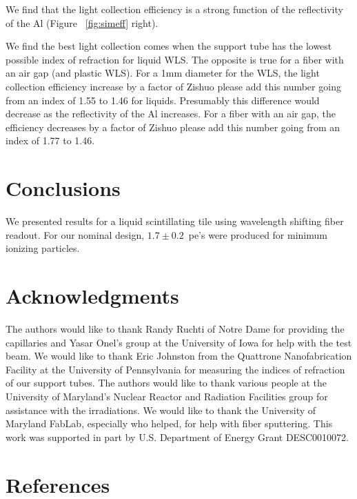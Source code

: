 \documentclass[review]{elsarticle}
\begin{document}
We find that the light collection efficiency is a strong function of
the reflectivity of the Al (Figure ~\ref{fig:simeff} right).

We find the best light collection comes when the support tube has the
lowest possible index of refraction for liquid WLS. The opposite is
true for a fiber with an air gap (and plastic WLS). For a 1mm
diameter for the WLS, the light collection efficiency increase by a
factor of {\color{red} Zishuo please add this number} going from an
index of 1.55 to 1.46 for liquids. Presumably this difference would
decrease as the reflectivity of the Al increases. For a fiber with an
air gap, the efficiency decreases by a factor of {\color{red} Zishuo
 please add this number} going from an index of 1.77 to 1.46.

\section{Conclusions}

We presented results for a liquid scintillating tile using wavelength
shifting fiber readout. For our nominal design, $1.7\pm 0.2$~pe's
were produced for minimum ionizing particles.

\section{Acknowledgments}
The authors would like to thank Randy Ruchti of Notre Dame for
providing the capillaries and Yasar Onel's group at the University of
Iowa for help with the test beam. We would like to thank Eric
Johnston from the Quattrone Nanofabrication Facility at the University
of Pennsylvania for measuring the indices of refraction of our support
tubes. 
The authors would like to thank {\color{red} various people} at
the University of Maryland's Nuclear Reactor and Radiation
Facilities group for assistance
with the irradiations.
 We would like to thank the University of Maryland
FabLab, especially {\color{red} who helped}, for help with fiber sputtering.
This work was supported in part by U.S. Department of Energy
Grant DESC0010072.

\section*{References}


\end{document}
